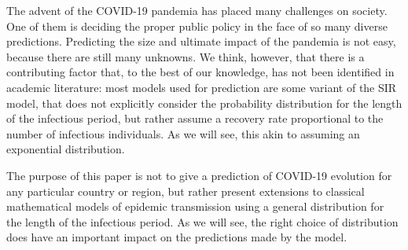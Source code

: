 \documentclass[USenglish,10pt]{article}
\begin{document}
The advent of the COVID-19 pandemia has placed many challenges on society.
One of them is deciding the proper public policy in the face of so many diverse predictions.
Predicting the size and ultimate impact of the pandemia is not easy, because there are still many unknowns.
We think, however, that there is a contributing factor that, to the best of our knowledge, has not been identified in academic literature: most models used for prediction are some variant of the SIR model, that does not explicitly consider the probability distribution for the length of the infectious period, but rather assume a recovery rate proportional to the number of infectious individuals. As we will see, this akin to assuming an exponential distribution.

The purpose of this paper is not to give a prediction of COVID-19 evolution for any particular country or region, but rather present extensions to classical mathematical models of epidemic transmission using a general distribution for the length of the infectious period. As we will see, the right choice of distribution does have an important impact on the predictions made by the model.
\end{document}
